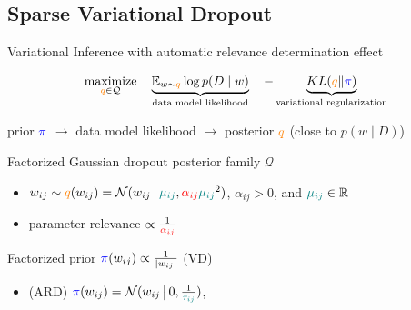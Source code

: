 \documentclass{beamer}
\newcommand{\real}{\mathbb{R}}
\begin{document}
\subsection{Sparse Variational Dropout \citep{molchanov_variational_2017}} %
\label{sub:sparse_variational_dropout}

\begin{frame}[c]{\insertsubsection}{\insertsection}
  Variational Inference with automatic relevance determination effect


  $$
    \underset{
      {\color{orange} q} \in \mathcal{Q}
    }{\text{maximize}}
    \quad
    \underbrace{
      \mathbb{E}_{w \sim {\color{orange} q}}
          \log p(D\mid w)  %
    }_{
      \text{data model likelihood}
    }
    \quad
    - \underbrace{
      KL({\color{orange} q}\|{\color{blue} \pi})
    }_{
      \text{variational regularization}
    }
    $$

  \medskip
  prior ${\color{blue} \pi}$
    $\to$ data model likelihood
    $\to$ posterior ${\color{orange} q}$
    (close to $p(w \mid D)$)
  
  \bigskip
  Factorized Gaussian dropout posterior family $\mathcal{Q}$
  \begin{itemize}
    \item $
      w_{ij} \sim {\color{orange} q}(w_{ij})
        = \mathcal{N}(
          w_{ij}\,\big\vert\,
          {\color{teal} \mu_{ij}},
          {\color{red} \alpha_{ij}}
            {\color{teal} \mu_{ij}}^2
        )
    $, $\alpha_{ij} > 0$, and ${\color{teal} \mu_{ij}} \in \real$
    \item parameter relevance $\propto \frac1{{\color{red} \alpha_{ij}}}$
  \end{itemize}

  \smallskip
  Factorized prior $
    {\color{blue} \pi}(w_{ij})
      \propto \frac1{\lvert w_{ij}\rvert}
  $ (VD)
  \begin{itemize}
    \item (ARD) $
      {\color{blue} \pi}(w_{ij}) = \mathcal{N}(
        w_{ij}\,\big\vert\,
        0, \tfrac1{{\color{teal} \tau_{ij}}}
      )
    $, \citep{kharitonov_variational_2018}
  \end{itemize}
\end{frame}
\end{document}

